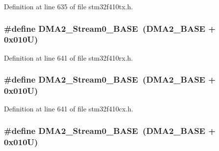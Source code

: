 Definition at line 635 of file stm32f410tx.\+h.

\subsubsection[{\texorpdfstring{D\+M\+A2\+\_\+\+Stream0\+\_\+\+B\+A\+SE}{DMA2_Stream0_BASE}}]{\setlength{\rightskip}{0pt plus 5cm}\#define D\+M\+A2\+\_\+\+Stream0\+\_\+\+B\+A\+SE~({\bf D\+M\+A2\+\_\+\+B\+A\+SE} + 0x010\+U)}\hypertarget{group___peripheral__registers__structures_gac4c67b24726ba6b94d03adb351bcec4d}{}\label{group___peripheral__registers__structures_gac4c67b24726ba6b94d03adb351bcec4d}


Definition at line 641 of file stm32f410rx.\+h.

\subsubsection[{\texorpdfstring{D\+M\+A2\+\_\+\+Stream0\+\_\+\+B\+A\+SE}{DMA2_Stream0_BASE}}]{\setlength{\rightskip}{0pt plus 5cm}\#define D\+M\+A2\+\_\+\+Stream0\+\_\+\+B\+A\+SE~({\bf D\+M\+A2\+\_\+\+B\+A\+SE} + 0x010\+U)}\hypertarget{group___peripheral__registers__structures_gac4c67b24726ba6b94d03adb351bcec4d}{}\label{group___peripheral__registers__structures_gac4c67b24726ba6b94d03adb351bcec4d}


Definition at line 641 of file stm32f410cx.\+h.

\subsubsection[{\texorpdfstring{D\+M\+A2\+\_\+\+Stream0\+\_\+\+B\+A\+SE}{DMA2_Stream0_BASE}}]{\setlength{\rightskip}{0pt plus 5cm}\#define D\+M\+A2\+\_\+\+Stream0\+\_\+\+B\+A\+SE~({\bf D\+M\+A2\+\_\+\+B\+A\+SE} + 0x010\+U)}\hypertarget{group___peripheral__registers__structures_gac4c67b24726ba6b94d03adb351bcec4d}{}\label{group___peripheral__registers__structures_gac4c67b24726ba6b94d03adb351bcec4d}


